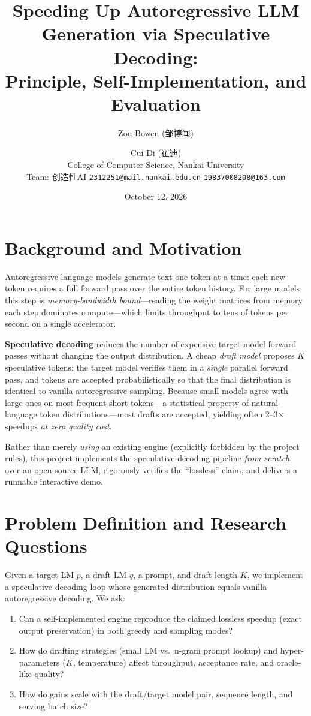 \documentclass[11pt]{article}
\title{Speeding Up Autoregressive LLM Generation via Speculative Decoding:\\[1mm]
Principle, Self-Implementation, and Evaluation}
\author{
  Zou Bowen (邹博闻) \and Cui Di (崔迪) \\
  College of Computer Science, Nankai University\\
  Team: 创造性AI \qquad \texttt{2312251@mail.nankai.edu.cn} \qquad \texttt{19837008208@163.com}
}
\date{October 12, 2026}
\begin{document}
\maketitle

\section{Background and Motivation}
Autoregressive language models generate text one token at a time: each new token
requires a full forward pass over the entire token history. For large models this
step is \emph{memory-bandwidth bound}---reading the weight matrices from memory each
step dominates compute---which limits throughput to tens of tokens per second on a
single accelerator.

\textbf{Speculative decoding} \citep{leviathan2023fast, chen2023accelerating}
reduces the number of expensive target-model forward passes without changing the
output distribution. A cheap \emph{draft model} proposes $K$ speculative tokens;
the target model verifies them in a \emph{single} parallel forward pass, and
tokens are accepted probabilistically so that the final distribution is identical
to vanilla autoregressive sampling. Because small models agree with large ones on
most frequent short tokens---a statistical property of natural-language token
distributions---most drafts are accepted, yielding often 2--3$\times$ speedups
\emph{at zero quality cost}.

Rather than merely \emph{using} an existing engine (explicitly forbidden by the
project rules), this project implements the speculative-decoding pipeline
\emph{from scratch} over an open-source LLM, rigorously verifies the ``lossless''
claim, and delivers a runnable interactive demo.

\section{Problem Definition and Research Questions}
Given a target LM $p$, a draft LM $q$, a prompt, and draft length $K$, we implement
a speculative decoding loop whose generated distribution equals vanilla
autoregressive decoding. We ask:

\begin{enumerate}[label=RQ\arabic*.]
\item Can a self-implemented engine reproduce the claimed lossless speedup (exact
      output preservation) in both greedy and sampling modes?
\item How do drafting strategies (small LM vs.~n-gram prompt lookup) and
      hyper-parameters ($K$, temperature) affect throughput, acceptance rate, and
      oracle-like quality?
\item How do gains scale with the draft/target model pair, sequence length, and
      serving batch size?
\end{enumerate}
\end{document}
